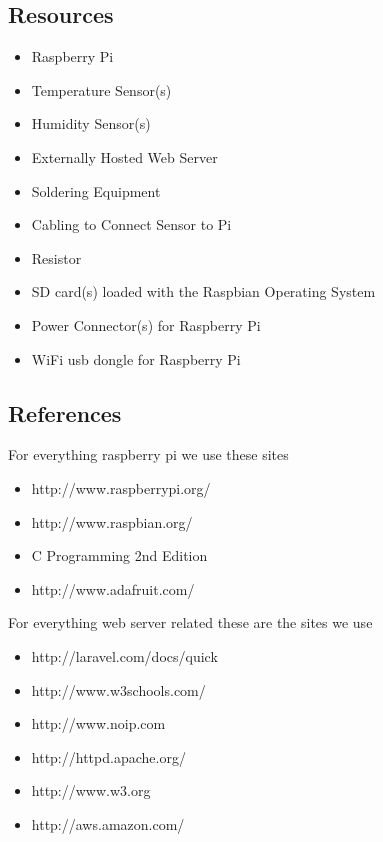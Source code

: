 \documentclass{report}
\begin{document}
\subsection*{Resources}

\begin{itemize}
	\item Raspberry Pi
	\item Temperature Sensor(s)
	\item Humidity Sensor(s)
	\item Externally Hosted Web Server
	\item Soldering Equipment
	\item Cabling to Connect Sensor to Pi
	\item Resistor
	\item SD card(s) loaded with the Raspbian Operating System
	\item Power Connector(s) for Raspberry Pi
	\item WiFi usb dongle for Raspberry Pi
\end{itemize}
\newpage

\subsection*{References}
For everything raspberry pi we use these sites
\begin{itemize}
	\item http://www.raspberrypi.org/
	\item http://www.raspbian.org/
	\item C Programming 2nd Edition
	\item http://www.adafruit.com/
\end{itemize}
For everything web server related these are the sites we use
\begin{itemize}
	\item http://laravel.com/docs/quick
	\item http://www.w3schools.com/
	\item http://www.noip.com
	\item http://httpd.apache.org/
	\item http://www.w3.org
	\item http://aws.amazon.com/
\end{itemize}
\newpage
\end{document}

